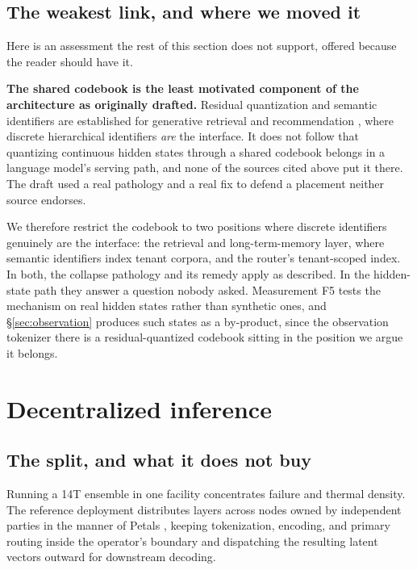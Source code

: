 \documentclass[11pt]{article}
\begin{document}
\subsection{The weakest link, and where we moved it}
\label{sec:weakest}

Here is an assessment the rest of this section does not support, offered because the reader should have it.

\textbf{The shared codebook is the least motivated component of the architecture as originally drafted.} Residual quantization and semantic identifiers are established for generative retrieval and recommendation \cite{rajput2023tiger}, where discrete hierarchical identifiers \emph{are} the interface. It does not follow that quantizing continuous hidden states through a shared codebook belongs in a language model's serving path, and none of the sources cited above put it there. The draft used a real pathology and a real fix to defend a placement neither source endorses.

We therefore restrict the codebook to two positions where discrete identifiers genuinely are the interface: the retrieval and long-term-memory layer, where semantic identifiers index tenant corpora, and the router's tenant-scoped index. In both, the collapse pathology and its remedy apply as described. In the hidden-state path they answer a question nobody asked. Measurement F5 tests the mechanism on real hidden states rather than synthetic ones, and \S\ref{sec:observation} produces such states as a by-product, since the observation tokenizer there is a residual-quantized codebook sitting in the position we argue it belongs.

\section{Decentralized inference}
\label{sec:decentralized}

\subsection{The split, and what it does not buy}

Running a 14T ensemble in one facility concentrates failure and thermal density. The reference deployment distributes layers across nodes owned by independent parties in the manner of Petals \cite{borzunov2023petals,neurips2023petals}, keeping tokenization, encoding, and primary routing inside the operator's boundary and dispatching the resulting latent vectors outward for downstream decoding.
\end{document}
